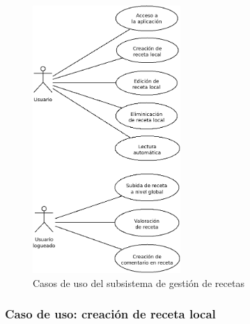 \begin{figure}[hp]
  \centering
  \includegraphics[width=0.5\textwidth]{cap4/img/diagrama_subsistema_recetas}
  \caption{Casos de uso del subsistema de gestión de recetas}
  \label{fig:subsistema-recetas}
\end{figure}

\subsubsection{Caso de uso: creación de receta local}

